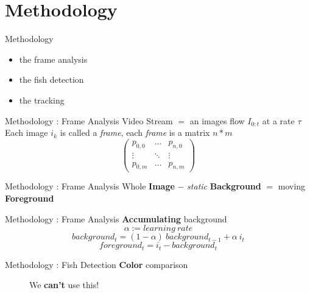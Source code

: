 \documentclass{beamer}
\begin{document}
\section{Methodology}

\begin{frame}[c]{Methodology}
\center
\begin{itemize}
\item the frame analysis
\item the fish detection
\item the tracking
\end{itemize}
\end{frame}

\begin{frame}[c]{Methodology : Frame Analysis}
\center
Video Stream $=$ an images flow $I_{0:t}$ at a rate $\tau$ \\
\pause
\bigskip
Each image $i_k$ is called a \textit{frame}, each \textit{frame} is a matrix $n*m$ 
\[ \left( \begin{array}{ccc}
p_{0,0} & \ldots & p_{n,0} \\
\vdots & \ddots & \vdots \\
p_{0,m} & \ldots & p_{n,m} \end{array} \right)\] 
\end{frame}

\begin{frame}[c]{Methodology : Frame Analysis}
\center
Whole \textbf{Image} $-$ \textit{static} \textbf{Background} $=$ moving \textbf{Foreground}\\
\centering %
\end{frame}


\begin{frame}[c]{Methodology : Frame Analysis}
\center \textbf{Accumulating} background\\

$$
\alpha := learning\ rate
$$
$$
background_t = (1-\alpha)\ background_{t-1} + \alpha\ i_t
$$
$$
foreground_t = i_t - background_t
$$

\end{frame}


\begin{frame}[c]{Methodology : Fish Detection}
\center \textbf{Color} comparison\\
\begin{figure}[hbtp]
\centering
\pause
\center We \textbf{can't} use this!
\end{figure}
\end{frame}
\end{document}
